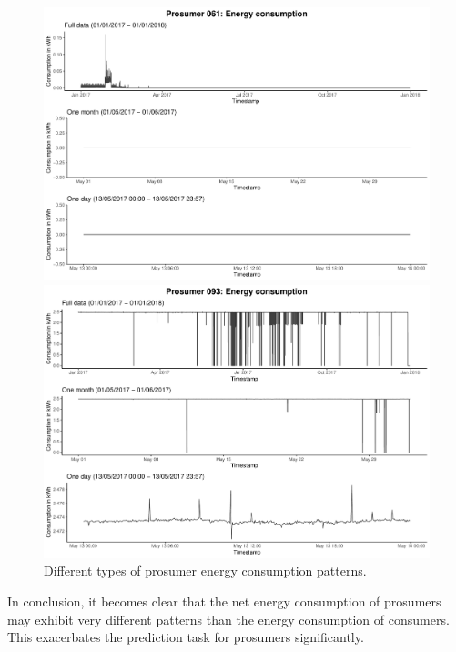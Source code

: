 \begin{figure}
    \begin{minipage}[h]{\dimexpr.5\textheight-0.15em}
    \includegraphics[width=\textwidth]{thesis/graphs/timeseries/p061_cons.pdf}
    \end{minipage}
    \begin{minipage}[h]{\dimexpr.5\textheight-0.15em}
    \includegraphics[width=\textwidth]{thesis/graphs/timeseries/p093_cons.pdf}
    \end{minipage}
    
    \caption[Different types of prosumer energy consumption patterns]{Different types of prosumer energy consumption patterns. \quantnet}
    \label{Fig:prosenergycons_peculiar}
\end{figure}

In conclusion, it becomes clear that the net energy consumption of prosumers may exhibit very different patterns than the energy consumption of consumers. This exacerbates the prediction task for prosumers significantly.

